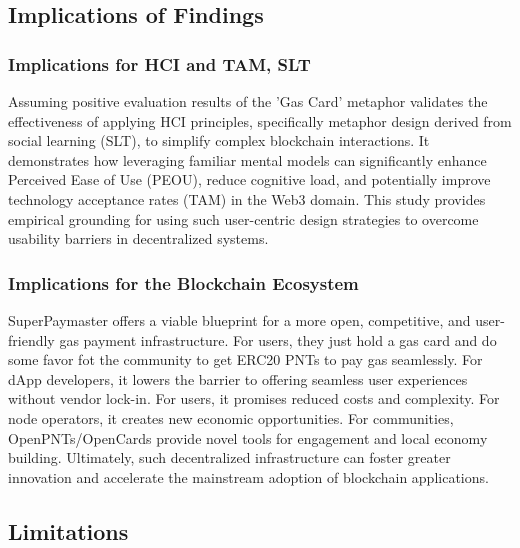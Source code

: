 \documentclass[preprint,12pt]{elsarticle}
\begin{document}
\subsection{Implications of Findings}
\label{subsec:implications}

\subsubsection{Implications for HCI and TAM, SLT}

Assuming positive evaluation results of the 'Gas Card' metaphor validates the effectiveness of applying HCI principles, specifically metaphor design derived from social learning (SLT), to simplify complex blockchain interactions. It demonstrates how leveraging familiar mental models can significantly enhance Perceived Ease of Use (PEOU), reduce cognitive load, and potentially improve technology acceptance rates (TAM) in the Web3 domain. This study provides empirical grounding for using such user-centric design strategies to overcome usability barriers in decentralized systems.

\subsubsection{Implications for the Blockchain Ecosystem}

SuperPaymaster offers a viable blueprint for a more open, competitive, and user-friendly gas payment infrastructure. For users, they just hold a gas card and do some favor fot the community to get ERC20 PNTs to pay gas seamlessly. For dApp developers, it lowers the barrier to offering seamless user experiences without vendor lock-in. For users, it promises reduced costs and complexity. For node operators, it creates new economic opportunities. For communities, OpenPNTs/OpenCards provide novel tools for engagement and local economy building. Ultimately, such decentralized infrastructure can foster greater innovation and accelerate the mainstream adoption of blockchain applications.

\subsection{Limitations}
\label{subsec:limitations}
\end{document}
